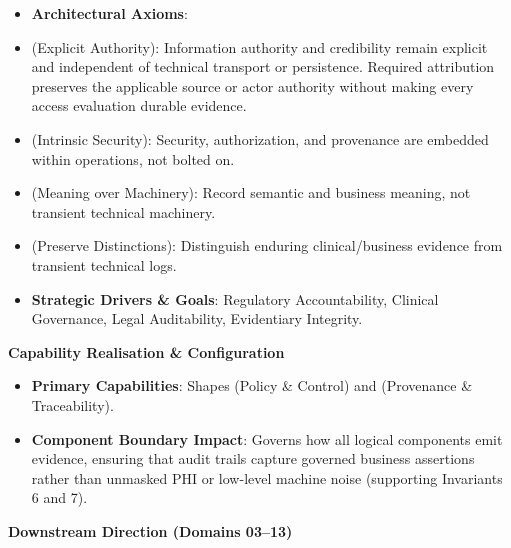 \begin{itemize}


\item \textbf{Architectural Axioms}:

\item \texttt{} (Explicit Authority): Information authority and credibility remain explicit and independent of technical transport or persistence. Required attribution preserves the applicable source or actor authority without making every access evaluation durable evidence.

\item \texttt{} (Intrinsic Security): Security, authorization, and provenance are embedded within operations, not bolted on.

\item \texttt{} (Meaning over Machinery): Record semantic and business meaning, not transient technical machinery.

\item \texttt{} (Preserve Distinctions): Distinguish enduring clinical/business evidence from transient technical logs.

\item \textbf{Strategic Drivers \& Goals}: Regulatory Accountability, Clinical Governance, Legal Auditability, Evidentiary Integrity.

\end{itemize}


\par\medskip\textbf{Capability Realisation \& Configuration}\par


\begin{itemize}


\item \textbf{Primary Capabilities}: Shapes \texttt{} (Policy \& Control) and \texttt{} (Provenance \& Traceability).

\item \textbf{Component Boundary Impact}: Governs how all logical components emit evidence, ensuring that audit trails capture governed business assertions rather than unmasked PHI or low-level machine noise (supporting Invariants 6 and 7).

\end{itemize}


\par\medskip\textbf{Downstream Direction (Domains 03–13)}\par


